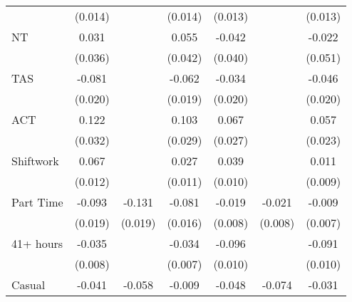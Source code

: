 {\begin{tabular}{l*{6}{c}}
                    &     (0.014)         &                     &     (0.014)         &     (0.013)         &                     &     (0.013)         \\
NT                  &       0.031         &                     &       0.055         &      -0.042         &                     &      -0.022         \\
                    &     (0.036)         &                     &     (0.042)         &     (0.040)         &                     &     (0.051)         \\
TAS                 &      -0.081\sym{***}&                     &      -0.062\sym{***}&      -0.034\sym{*}  &                     &      -0.046\sym{**} \\
                    &     (0.020)         &                     &     (0.019)         &     (0.020)         &                     &     (0.020)         \\
ACT                 &       0.122\sym{***}&                     &       0.103\sym{***}&       0.067\sym{**} &                     &       0.057\sym{**} \\
                    &     (0.032)         &                     &     (0.029)         &     (0.027)         &                     &     (0.023)         \\
Shiftwork           &       0.067\sym{***}&                     &       0.027\sym{**} &       0.039\sym{***}&                     &       0.011         \\
                    &     (0.012)         &                     &     (0.011)         &     (0.010)         &                     &     (0.009)         \\
Part Time           &      -0.093\sym{***}&      -0.131\sym{***}&      -0.081\sym{***}&      -0.019\sym{**} &      -0.021\sym{***}&      -0.009         \\
                    &     (0.019)         &     (0.019)         &     (0.016)         &     (0.008)         &     (0.008)         &     (0.007)         \\
41+ hours           &      -0.035\sym{***}&                     &      -0.034\sym{***}&      -0.096\sym{***}&                     &      -0.091\sym{***}\\
                    &     (0.008)         &                     &     (0.007)         &     (0.010)         &                     &     (0.010)         \\
Casual              &      -0.041\sym{***}&      -0.058\sym{***}&      -0.009         &      -0.048\sym{***}&      -0.074\sym{***}&      -0.031\sym{***}\\

\end{tabular}}
